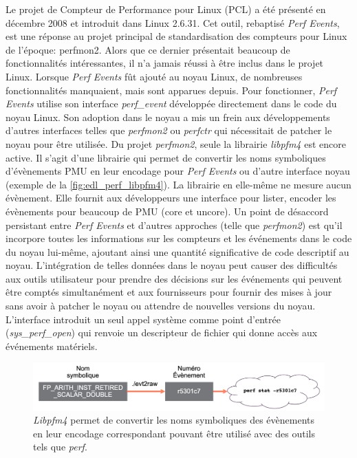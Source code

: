             Le projet de Compteur de Performance pour Linux (PCL) a été présenté en décembre 2008 et introduit dans Linux 2.6.31. Cet outil, rebaptisé \textit{Perf Events}, est une réponse au projet principal de standardisation des compteurs pour Linux de l'époque: perfmon2. Alors que ce dernier présentait beaucoup de fonctionnalités intéressantes, il n'a jamais réussi à être inclus dans le projet Linux. Lorsque \textit{Perf Events} fût ajouté au noyau Linux, de nombreuses fonctionnalités manquaient, mais sont apparues depuis. Pour fonctionner, \textit{Perf Events} utilise son interface \textit{perf\_event} développée directement dans le code du noyau Linux. Son adoption dans le noyau a mis un frein aux développements d'autres interfaces telles que \textit{perfmon2} ou \textit{perfctr} qui nécessitait de patcher le noyau pour être utilisée.  Du projet \textit{perfmon2}, seule la librairie \textit{libpfm4} est encore active. Il s'agit d'une librairie qui permet de convertir les noms symboliques d'évènements PMU en leur encodage pour \textit{Perf Events} ou d'autre interface noyau (exemple de la \autoref{fig:edl_perf_libpfm4}). La librairie en elle-même ne mesure aucun évènement. Elle fournit aux développeurs une interface pour lister, encoder les évènements pour beaucoup de PMU (core et uncore). Un point de désaccord persistant entre \textit{Perf Events} et d'autres approches (telle que \textit{perfmon2}) est qu'il incorpore toutes les informations sur les compteurs et les événements dans le code du noyau lui-même, ajoutant ainsi une quantité significative de code descriptif au noyau. L'intégration de telles données dans le noyau peut causer des difficultés aux outils utilisateur pour prendre des décisions sur les événements qui peuvent être comptés simultanément et aux fournisseurs pour fournir des mises à jour sans avoir à patcher le noyau ou attendre de nouvelles versions du noyau. L'interface introduit un seul appel système comme point d'entrée (\textit{sys\_perf\_open}) qui renvoie un descripteur de fichier qui donne accès aux événements matériels. 
            
            \begin{figure}[h!]
            \center
            \includegraphics[width=12cm]{images/edl_perf_libpfm4.png}
            \caption{\label{fig:edl_perf_libpfm4} \textit{Libpfm4} permet de convertir les noms symboliques des évènements en leur encodage correspondant pouvant être utilisé avec des outils tels que \textit{perf}.}
            \end{figure}
 
